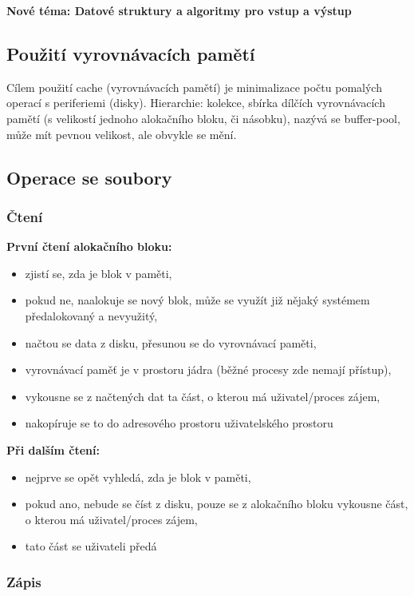 \documentclass[a4paper, 11pt]{article}
\begin{document}
\newpage

\textbf{Nové téma: Datové struktury a algoritmy pro vstup a výstup}

\subsection{Použití vyrovnávacích pamětí}
Cílem použití cache (vyrovnávacích pamětí) je minimalizace počtu pomalých operací s periferiemi (disky). Hierarchie:
kolekce, sbírka dílčích vyrovnávacích pamětí (s velikostí jednoho alokačního bloku, či násobku), nazývá se buffer-pool, může mít pevnou velikost, ale obvykle se mění.

\subsection{Operace se soubory}
\subsubsection{Čtení}
\textbf{První čtení alokačního bloku:}
\begin{itemize}
    \item zjistí se, zda je blok v paměti,
    \item pokud ne, naalokuje se nový blok, může se využít již nějaký systémem předalokovaný a nevyužitý,
    \item načtou se data z disku, přesunou se do vyrovnávací paměti,
    \item vyrovnávací paměť je v prostoru jádra (běžné procesy zde nemají přístup),
    \item vykousne se z načtených dat ta část, o kterou má uživatel/proces zájem,
    \item nakopíruje se to do adresového prostoru uživatelského prostoru
\end{itemize}
 
\textbf{Při dalším čtení:}
\begin{itemize}
    \item nejprve se opět vyhledá, zda je blok v paměti,
    \item pokud ano, nebude se číst z disku, pouze se z alokačního bloku vykousne část, o kterou má uživatel/proces zájem,
    \item tato část se uživateli předá
\end{itemize}
 
\subsubsection{Zápis}
 
\end{document}
